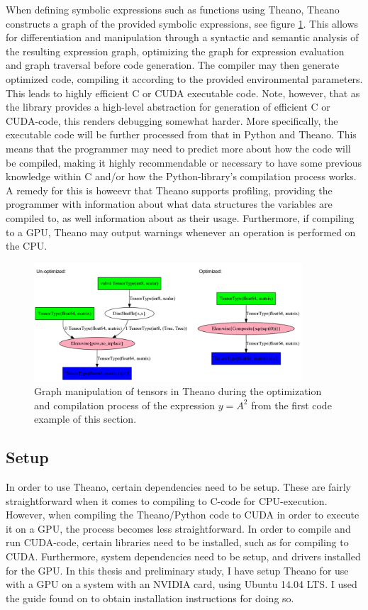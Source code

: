 When defining symbolic expressions such as functions using Theano, Theano constructs a graph of the provided symbolic expressions, see figure \ref{fig:theano_graph_demo}. This allows for differentiation and manipulation through a syntactic and semantic analysis of the resulting expression graph, optimizing the graph for expression evaluation and graph traversal before code generation. The compiler may then generate optimized code, compiling it according to the provided environmental parameters. This leads to highly efficient C or CUDA executable code.
Note, however, that as the library provides a high-level abstraction for generation of efficient C or CUDA-code, this renders debugging somewhat harder. More specifically, the executable code will be further processed from that in Python and Theano. This means that the programmer may need to predict more about how the code will be compiled, making it highly recommendable or necessary to have some previous knowledge within C and/or how the Python-library's compilation process works. A remedy for this is howeevr that Theano supports profiling, providing the programmer with information about what data structures the variables are compiled to, as well information about as their usage. Furthermore, if compiling to a GPU, Theano may output warnings whenever an operation is performed on the CPU.

\begin{figure}
\centering
\includegraphics[width=10cm]{fig/unopt_opt_theano_graph}
\caption{Graph manipulation of tensors in Theano during the optimization and compilation process of the expression $y = A^2$ from the first code example of this section.}
\label{fig:theano_graph_demo}
\end{figure}

\subsection{Setup}

In order to use Theano, certain dependencies need to be setup. These are fairly straightforward when it comes to compiling to C-code for CPU-execution. However, when compiling the Theano/Python code to CUDA in order to execute it on a GPU, the process becomes less straightforward. In order to compile and run CUDA-code, certain libraries need to be installed, such as for compiling to CUDA. Furthermore, system dependencies need to be setup, and drivers installed for the GPU. In this thesis and preliminary study, I have setup Theano for use with a GPU on a system with an NVIDIA card, using Ubuntu 14.04 LTS. I used the guide found on \citep{LISA-lab2015b} to obtain installation instructions for doing so.

